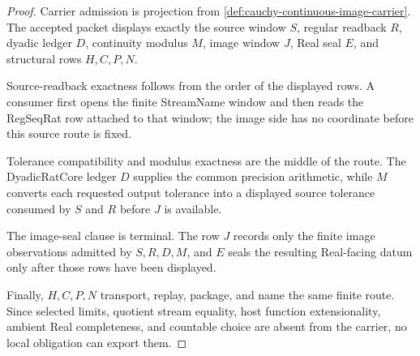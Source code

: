 \begin{proof}
Carrier admission is projection from \autoref{def:cauchy-continuous-image-carrier}. The accepted packet displays exactly the source window $S$, regular readback $R$, dyadic ledger $D$, continuity modulus $M$, image window $J$, Real seal $E$, and structural rows $H,C,P,N$.

Source-readback exactness follows from the order of the displayed rows. A consumer first opens the finite StreamName window and then reads the RegSeqRat row attached to that window; the image side has no coordinate before this source route is fixed.

Tolerance compatibility and modulus exactness are the middle of the route. The DyadicRatCore ledger $D$ supplies the common precision arithmetic, while $M$ converts each requested output tolerance into a displayed source tolerance consumed by $S$ and $R$ before $J$ is available.

The image-seal clause is terminal. The row $J$ records only the finite image observations admitted by $S,R,D,M$, and $E$ seals the resulting Real-facing datum only after those rows have been displayed.

Finally, $H,C,P,N$ transport, replay, package, and name the same finite route. Since selected limits, quotient stream equality, host function extensionality, ambient Real completeness, and countable choice are absent from the carrier, no local obligation can export them.
\end{proof}

